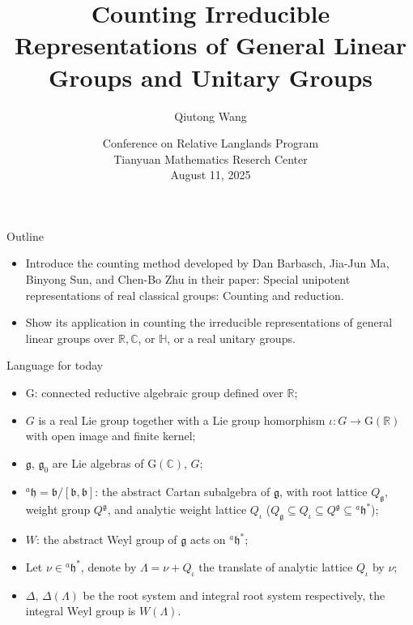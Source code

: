 \documentclass[fleqn,xcolor=dvipsnames]{beamer}
\title[]{Counting Irreducible Representations of General Linear Groups and Unitary Groups}
\author{Qiutong Wang}
\institute{Zhejiang University}
\date{Conference on Relative Langlands Program\\
  Tianyuan Mathematics Reserch Center\\ August 11, 2025}
\newcommand{\BC}{{\mathbb {C}}}
\newcommand{\BH}{{\mathbb {H}}}
\newcommand{\BR}{{\mathbb {R}}}
\newcommand{\RG}{{\mathrm {G}}}
\newcommand{\fb}{\mathfrak{b}}
\newcommand{\fg}{\mathfrak{g}}
\newcommand{\fh}{\mathfrak{h}}
\begin{document}
\begin{frame}
  \titlepage
\end{frame}




\begin{frame}{Outline}

\begin{itemize}
  \item Introduce the counting method developed by Dan Barbasch, Jia-Jun Ma, Binyong Sun, and Chen-Bo Zhu in their paper: Special unipotent representations of real classical groups: Counting and reduction.
   \item Show its application in counting the irreducible representations of general linear groups over $\BR, \BC$, or $\BH$, or a real unitary groups.
\end{itemize}
\end{frame}












\begin{frame}{Language for today}
  \begin{itemize}
    \item $\RG$: connected reductive algebraic group defined over $\BR$;
    \item $G$ is a real Lie group together with a Lie group homorphism $\iota: G \to \RG(\BR)$ with open image and finite kernel;
    \item $\fg$, $\fg_0$ are Lie algebras of $\RG(\BC)$, $G$;
    \item $^{a}\fh = \fb/[\fb,\fb]$: the abstract Cartan subalgebra of $\fg$, with root lattice $Q_{\fg}$, weight group $Q^{\fg}$, and analytic weight lattice $Q_{\iota}$ ($Q_{\fg} \subseteq Q_{\iota} \subseteq Q^{\fg} \subseteq {^{a}\fh}^*$);
    \item $W$: the abstract Weyl group of $\fg$ acts on $^{a}\fh^*$;
    \item Let $\nu \in {^{a}\fh}^*$, denote by $\Lambda = \nu + Q_{\iota}$ the translate of analytic lattice $Q_{\iota}$ by $\nu$;
    \item $\Delta$, $\Delta(\Lambda)$ be the root system and integral root system respectively, the integral Weyl group is $W(\Lambda)$.
  \end{itemize}
\end{frame}
\end{document}

